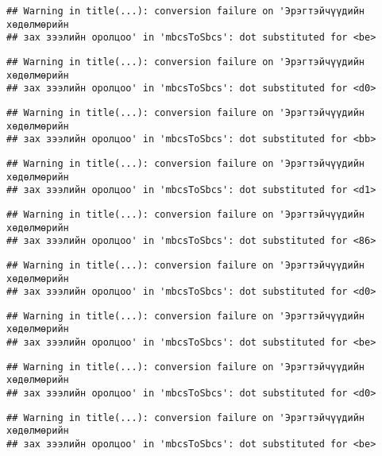 \documentclass[]{article}
\begin{document}
\begin{verbatim}
## Warning in title(...): conversion failure on 'Эрэгтэйчүүдийн хөдөлмөрийн
## зах зээлийн оролцоо' in 'mbcsToSbcs': dot substituted for <be>
\end{verbatim}

\begin{verbatim}
## Warning in title(...): conversion failure on 'Эрэгтэйчүүдийн хөдөлмөрийн
## зах зээлийн оролцоо' in 'mbcsToSbcs': dot substituted for <d0>
\end{verbatim}

\begin{verbatim}
## Warning in title(...): conversion failure on 'Эрэгтэйчүүдийн хөдөлмөрийн
## зах зээлийн оролцоо' in 'mbcsToSbcs': dot substituted for <bb>
\end{verbatim}

\begin{verbatim}
## Warning in title(...): conversion failure on 'Эрэгтэйчүүдийн хөдөлмөрийн
## зах зээлийн оролцоо' in 'mbcsToSbcs': dot substituted for <d1>
\end{verbatim}

\begin{verbatim}
## Warning in title(...): conversion failure on 'Эрэгтэйчүүдийн хөдөлмөрийн
## зах зээлийн оролцоо' in 'mbcsToSbcs': dot substituted for <86>
\end{verbatim}

\begin{verbatim}
## Warning in title(...): conversion failure on 'Эрэгтэйчүүдийн хөдөлмөрийн
## зах зээлийн оролцоо' in 'mbcsToSbcs': dot substituted for <d0>
\end{verbatim}

\begin{verbatim}
## Warning in title(...): conversion failure on 'Эрэгтэйчүүдийн хөдөлмөрийн
## зах зээлийн оролцоо' in 'mbcsToSbcs': dot substituted for <be>
\end{verbatim}

\begin{verbatim}
## Warning in title(...): conversion failure on 'Эрэгтэйчүүдийн хөдөлмөрийн
## зах зээлийн оролцоо' in 'mbcsToSbcs': dot substituted for <d0>
\end{verbatim}

\begin{verbatim}
## Warning in title(...): conversion failure on 'Эрэгтэйчүүдийн хөдөлмөрийн
## зах зээлийн оролцоо' in 'mbcsToSbcs': dot substituted for <be>
\end{verbatim}
\end{document}
